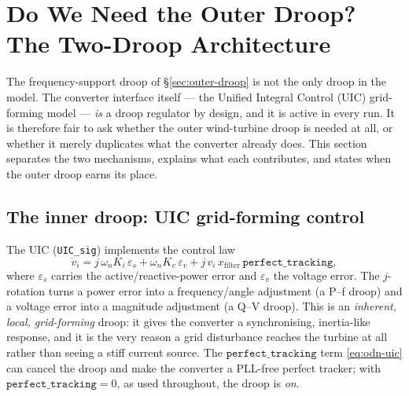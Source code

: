 
\section{Do We Need the Outer Droop? The Two-Droop Architecture}
\label{sec:outer-droop-necessity}

The frequency-support droop of \S\ref{sec:outer-droop} is not the only droop in
the model. The converter interface itself --- the Unified Integral Control (UIC)
grid-forming model --- \emph{is} a droop regulator by design, and it is active in
every run. It is therefore fair to ask whether the outer wind-turbine droop is
needed at all, or whether it merely duplicates what the converter already does.
This section separates the two mechanisms, explains what each contributes, and
states when the outer droop earns its place.

\subsection{The inner droop: UIC grid-forming control}
\label{subsec:odn-inner}

The UIC (\texttt{UIC\_sig}) implements the control law
\begin{equation}
  \dot{v}_i = j\,\omega_n K_i\,\varepsilon_s
            + \omega_n K_v\,\varepsilon_v
            + j\,v_i\,x_{\mathrm{filter}}\,\texttt{perfect\_tracking},
  \label{eq:odn-uic}
\end{equation}
where \(\varepsilon_s\) carries the active/reactive-power error and
\(\varepsilon_v\) the voltage error. The \(j\)-rotation turns a power error into a
frequency/angle adjustment (a P--f droop) and a voltage error into a magnitude
adjustment (a Q--V droop). This is an \emph{inherent, local, grid-forming} droop:
it gives the converter a synchronising, inertia-like response, and it is the very
reason a grid disturbance reaches the turbine at all rather than seeing a stiff
current source. The \(\texttt{perfect\_tracking}\) term \eqref{eq:odn-uic} can
cancel the droop and make the converter a PLL-free perfect tracker; with
\(\texttt{perfect\_tracking}=0\), as used throughout, the droop is \emph{on}.

